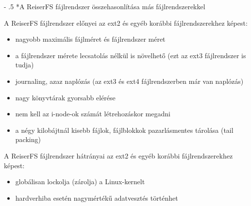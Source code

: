 \documentclass[tikz,12pt,margin=0px]{article}
\makeatletter
\renewcommand\paragraph{%
	\@startsection{paragraph}{4}{0mm}%
	{-\baselineskip}%
	{.5\baselineskip}%
	{\normalfont\normalsize\bfseries}}
\makeatother
\begin{document}
    \paragraph*{A ReiserFS fájlrendszer összehasonlítása más fájlrendszerekkel\\}

    \noindent A ReiserFS fájlrendszer előnyei az ext2 és egyéb korábbi fájlrendszerekhez képest:

    \begin{itemize}[topsep=8pt,itemsep=4pt,partopsep=4pt, parsep=4pt]
        \item nagyobb maximális fájlméret és fájlrendszer méret
        \item a fájlrendszer mérete lecsatolás nélkül is növelhető (ezt az ext3 fájlrendszer is tudja)
        \item journaling, azaz naplózás (az ext3 és ext4 fájlrendszerben már van naplózás)
        \item nagy könyvtárak gyorsabb elérése
        \item nem kell az i-node-ok számát létrehozáskor megadni
        \item a négy kilobájtnál kisebb fájlok, fájlblokkok pazarlásmentes tárolása (tail packing)
    \end{itemize}

    \noindent A ReiserFS fájlrendszer hátrányai az ext2 és egyéb korábbi fájlrendszerekhez képest:
    \begin{itemize}[topsep=8pt,itemsep=4pt,partopsep=4pt, parsep=4pt]
        \item globálisan lockolja (zárolja) a Linux-kernelt
        \item hardverhiba esetén nagymértékű adatvesztés történhet
    \end{itemize}
\end{document}
